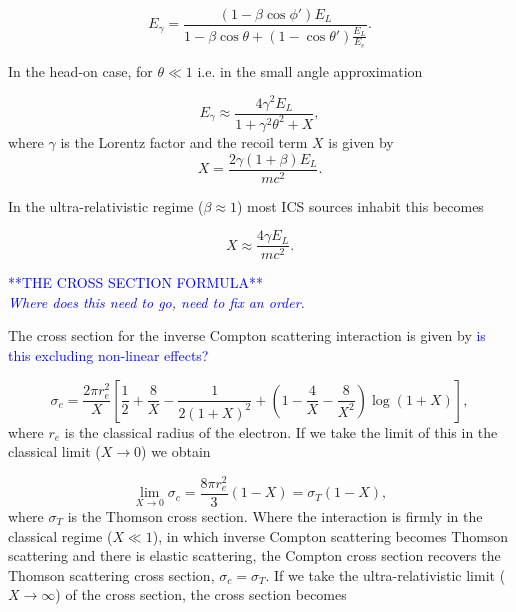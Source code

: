 \documentclass[../main.tex]{subfiles}
\begin{document}
\begin{equation}
E_{\gamma} = \frac{\left(1-\beta\cos\phi'\right)E_{L}}{1-\beta\cos\theta+\left(1-\cos\theta'\right)\frac{E_{L}}{E_{e}}}. 
\label{eq:scattered_photon_energy}
\end{equation}
  
In the head-on case, for $\theta \ll 1$ i.e. in the small angle approximation

\begin{equation}
E_{\gamma} \approx \frac{4\gamma^{2}E_{L}}{1+\gamma^{2}\theta^{2}+X},    
\label{eq:small_angle_scattered_photon_energy}
\end{equation}
where $\gamma$ is the Lorentz factor and the recoil term $X$ is given by
\begin{equation}
X = \frac{2\gamma\left(1+\beta\right)E_{L}}{mc^{2}}.
\label{eq:recoil_term}
\end{equation}

In the ultra-relativistic regime ($\beta \approx 1$) most ICS sources inhabit this becomes

\begin{equation}
X \approx \frac{4\gamma E_{L}}{mc^{2}}.
\label{eq:recoil_term_ultrarelativistic}    
\end{equation}

\textcolor{blue}{**THE CROSS SECTION FORMULA** \\ \textit{Where does this need to go, need to fix an order.}}

The cross section for the inverse Compton scattering interaction \cite{landau1982course} is given by \textcolor{blue}{is this excluding non-linear effects?}

\begin{equation}
 \sigma_{c} = \frac{2\pi r_{e}^{2}}{X}\left[\frac{1}{2}+\frac{8}{X}-\frac{1}{2\left(1+X\right)^{2}}+\left(1-\frac{4}{X}-\frac{8}{X^{2}}\right)\log{\left(1+X\right)}\right],
 \label{eq:compton_cross_section}
\end{equation}
where $r_{e}$ is the classical radius of the electron. If we take the limit of this in the classical limit ($X \to 0$) we obtain

\begin{equation}
\lim_{X \to 0} \sigma_{c} = \frac{8\pi r_{e}^{2}}{3}\left(1-X\right) = \sigma_{T}\left(1-X\right),
\label{eq:compton_cross_section_classical_limit}
\end{equation}
where $\sigma_{T}$ is the Thomson cross section. Where the interaction is firmly in the classical regime ($X \ll 1$), in which inverse Compton scattering becomes Thomson scattering and there is elastic scattering, the Compton cross section recovers the Thomson scattering cross section, $\sigma_{c} = \sigma_{T}$. If we take the ultra-relativistic limit ($X \to \infty$) of the cross section, the cross section becomes
\end{document}
